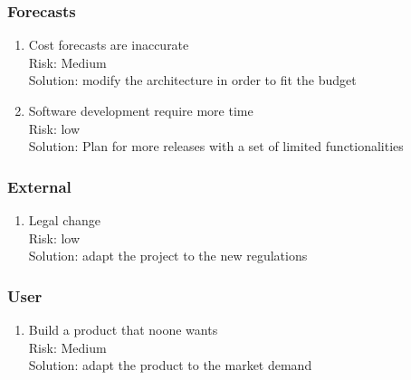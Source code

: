 \subsubsection{Forecasts}
\begin{enumerate}
\item Cost forecasts are inaccurate\\
Risk: Medium\\
Solution: modify the architecture in order to fit the budget\\
\item Software development require more time\\
Risk: low\\
Solution: Plan for more releases with a set of limited functionalities\\
\end{enumerate}

\subsubsection{External}
\begin{enumerate}
\item Legal change\\
Risk: low\\
Solution: adapt the project to the new regulations \\
\end{enumerate}

\subsubsection{User}
\begin{enumerate}
\item Build a product that noone wants\\
Risk: Medium\\
Solution: adapt the product to the market demand\\
\end{enumerate}


